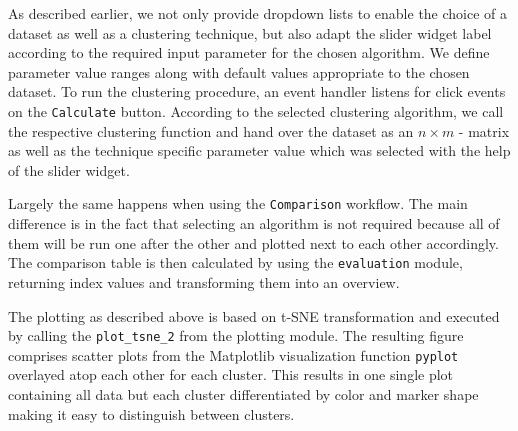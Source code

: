 As described earlier, we not only provide dropdown lists to enable the choice of a dataset as well as a clustering technique, but also adapt the slider widget label according to the required input parameter for the chosen algorithm. We define parameter value ranges along with default values appropriate to the chosen dataset. 
To run the clustering procedure, an event handler listens for click events on the \texttt{Calculate} button. According to the selected clustering algorithm, we call the respective clustering function and hand over the dataset as an $n \times m$ - matrix as well as the technique specific parameter value which was selected with the help of the slider widget.

Largely the same happens when using the \texttt{Comparison} workflow. The main difference is in the fact that selecting an algorithm is not required because all of them will be run one after the other and plotted next to each other accordingly. The comparison table is then calculated by using the \texttt{evaluation} module, returning index values and transforming them into an overview.

The plotting as described above is based on \gls{t-SNE} transformation and executed by calling the \texttt{plot_tsne_2} from the plotting module. The resulting figure comprises scatter plots from the Matplotlib visualization function \texttt{pyplot} \cite{Hunter:2007} overlayed atop each other for each cluster. This results in one single plot containing all data but each cluster differentiated by color and marker shape making it easy to distinguish between clusters.